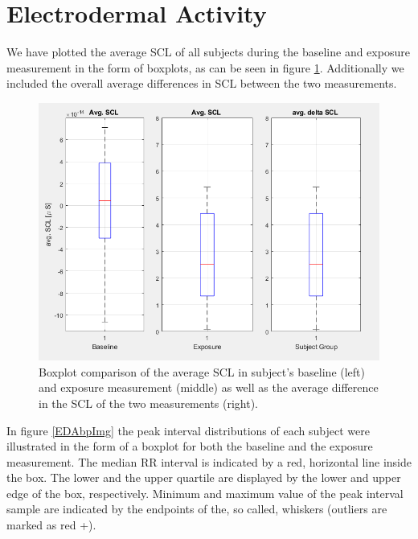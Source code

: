 
\section{Electrodermal Activity}

We have plotted the average SCL of all subjects during the baseline and exposure measurement in the form of boxplots, as can be seen in figure \ref{SCLbpImg}. Additionally we included the overall average differences in SCL between the two measurements.
 
\begin{figure}[h]
\centering
\includegraphics[width=1\textwidth]{images/avgSCL.png}
\caption{Boxplot comparison of the average SCL in subject's baseline (left) and exposure measurement (middle) as well as the average difference in the SCL of the two measurements (right).}
\label{SCLbpImg}
\end{figure}

\newpage
In figure \ref{EDAbpImg} the peak interval distributions of each subject were illustrated in the form of a boxplot for both the baseline and the exposure measurement. The median RR interval is indicated by a red, horizontal line inside the box. The lower and the upper quartile are displayed by the lower and upper edge of the box, respectively. Minimum and maximum value of the peak interval sample are indicated by the endpoints of the, so called, whiskers (outliers are marked as red +).

